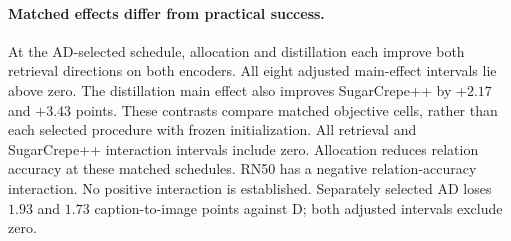 \paragraph{Matched effects differ from practical success.}
At the AD-selected schedule, allocation and distillation each improve both retrieval directions on both encoders.
All eight adjusted main-effect intervals lie above zero.
The distillation main effect also improves SugarCrepe++ by $+2.17$ and $+3.43$ points.
These contrasts compare matched objective cells, rather than each selected procedure with frozen initialization.
All retrieval and SugarCrepe++ interaction intervals include zero.
Allocation reduces relation accuracy at these matched schedules.
RN50 has a negative relation-accuracy interaction.
No positive interaction is established.
Separately selected AD loses $1.93$ and $1.73$ caption-to-image points against D; both adjusted intervals exclude zero.
